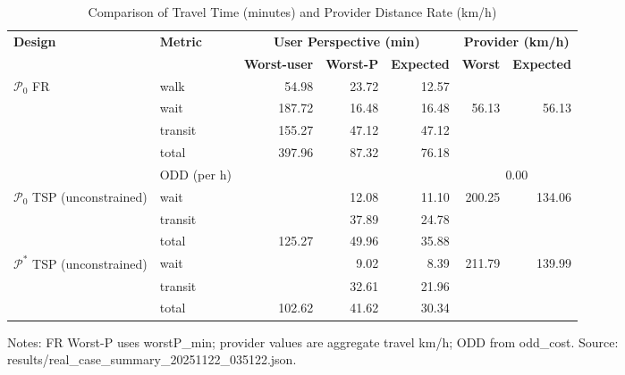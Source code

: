 \begin{table}[t]
\centering
\caption{Comparison of Travel Time (minutes) and Provider Distance Rate (km/h)}
\begin{tabular}{l l r r r r r}
\toprule
\textbf{Design} & \textbf{Metric} & 
\multicolumn{3}{c}{\textbf{User Perspective (min)}} & 
\multicolumn{2}{c}{\textbf{Provider (km/h)}} \\
\cmidrule(lr){3-5}\cmidrule(lr){6-7}
& & \textbf{Worst-user} & \textbf{Worst-P} & \textbf{Expected} & \textbf{Worst} & \textbf{Expected} \\
\midrule
$\mathcal{P}_0$ FR & walk    & 54.98 & 23.72 & 12.57 &        &        \\
                   & wait    & 187.72 & 16.48 & 16.48 & 56.13  & 56.13  \\
                   & transit & 155.27 & 47.12 & 47.12 &        &        \\
                   & total   & 397.96 & 87.32 & 76.18 &       &        \\
                   & ODD (per h) &  &  &  & \multicolumn{2}{c}{0.00} \\
\midrule
$\mathcal{P}_0$ TSP (unconstrained) & wait    &  & 12.08 & 11.10 & 200.25 & 134.06 \\
                                    & transit &  & 37.89 & 24.78 &        &       \\
                                    & total   & 125.27 & 49.96 & 35.88 &        &       \\
\midrule
$\mathcal{P}^*$ TSP (unconstrained) & wait    &  & 9.02 & 8.39 & 211.79 & 139.99 \\
                                    & transit &  & 32.61 & 21.96 &        &       \\
                                    & total   & 102.62 & 41.62 & 30.34 &        &       \\
\bottomrule
\end{tabular}

\vspace{0.5ex}
\small
Notes: FR Worst-P uses worstP\_min; provider values are aggregate travel km/h; ODD from odd\_cost. Source: results/real_case_summary_20251122_035122.json.
\end{table}